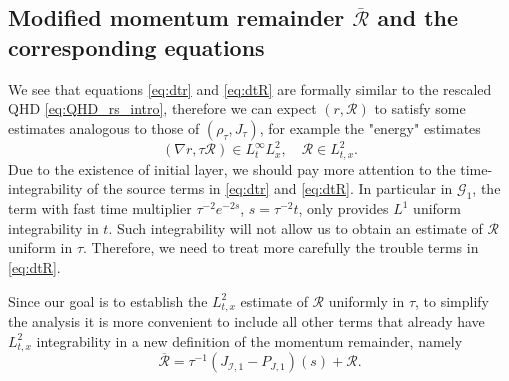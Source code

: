 \documentclass[english]{amsart}
\theoremstyle{plain}
\theoremstyle{definition}
\theoremstyle{remark}
\theoremstyle{plain}
\theoremstyle{plain}
\theoremstyle{plain}
\numberwithin{equation}{section}
\begin{document}
\subsection{Modified momentum remainder $\overline{\mathcal{R}}$ and the corresponding equations}

We see that equations \eqref{eq:dtr} and \eqref{eq:dtR} are formally similar to the rescaled QHD \eqref{eq:QHD_rs_intro}, therefore we can expect $(r,\mathcal{R})$ to satisfy some estimates analogous to those of $(\rho_\tau,J_\tau)$, for example the "energy" estimates
\[
(\nabla r,\tau\mathcal{R})\in L^\infty_tL^2_x,\quad \mathcal{R}\in L^2_{t,x}.
\]
Due to the existence of initial layer, we should pay more attention to the time-integrability of the source terms in  \eqref{eq:dtr} and \eqref{eq:dtR}. In particular in $\mathcal{G}_1$, the term with fast time multiplier $\tau^{-2}e^{-2s}$, $s=\tau^{-2}t$, only provides $L^1$ uniform integrability in $t$. Such integrability will not allow us to obtain an estimate of $\mathcal{R}$ uniform in $\tau$.  Therefore, we need to treat more carefully the trouble terms in \eqref{eq:dtR}.

Since our goal is to establish the $L^2_{t,x}$ estimate of $\mathcal{R}$ uniformly in $\tau$, to simplify the analysis it is more convenient to include all other terms that already have $L^2_{t,x}$ integrability in a new definition of the momentum remainder, namely
\begin{equation}\label{eq:alter_R}
\overline{\mathcal{R}}=\tau^{-1}(J_{\mathcal{I},1}-P_{J,1})(s)+\mathcal{R}.
\end{equation}
\end{document}
